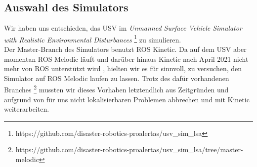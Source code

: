 \documentclass[conference]{IEEEtran}
\begin{document}
\subsection{Auswahl des Simulators}
Wir haben uns entschieden, das USV im \textit{Unmanned Surface Vehicle Simulator with Realistic Environmental Disturbances} \footnote{https://github.com/disaster-robotics-proalertas/usv\_sim\_lsa} zu simulieren.\\
Der Master-Branch des Simulators benutzt ROS Kinetic. Da auf dem USV aber momentan ROS Melodic läuft und darüber hinaus Kinetic nach April 2021 nicht mehr von ROS unterstützt wird \cite{b10}, hielten wir es für sinnvoll, zu versuchen, den Simulator auf ROS Melodic laufen zu lassen. Trotz des dafür vorhandenen Branches \footnote{https://github.com/disaster-robotics-proalertas/usv\_sim\_lsa/tree/master-melodic} mussten wir dieses Vorhaben letztendlich aus Zeitgründen und aufgrund von für uns nicht lokalisierbaren Problemen abbrechen und mit Kinetic weiterarbeiten.
\end{document}
